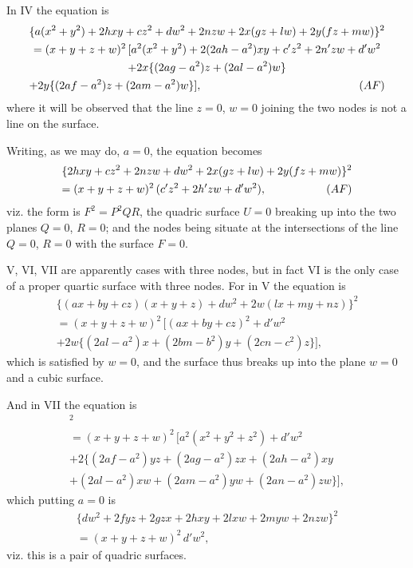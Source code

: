 \documentclass[11pt,a4paper]{article}
\begin{document}
\newpage
\setcounter{page}{310}

In IV the equation is
\begin{multline*}
\{a(x^{2}+y^{2}) + 2hxy + cz^{2} + dw^{2} + 2nzw + 2x(gz+lw) + 2y(fz+mw)\}^{2}\\
= (x+y+z+w)^{2}\, [a^{2}(x^{2}+y^{2}) + 2(2ah-a^{2})xy + c'z^{2} + 2n'zw + d'w^{2}\\
+ 2x\{(2ag-a^{2})z + (2al-a^{2})w\}\\
+ 2y\{(2af-a^{2})z + (2am-a^{2})w\}],\hfill(AF)
\end{multline*}
where it will be observed that the line $z=0$, $w=0$ joining the two nodes is not a line on the surface.

Writing, as we may do, $a=0$, the equation becomes
\begin{multline*}
\{2hxy + cz^{2} + 2nzw + dw^{2} + 2x(gz+lw) + 2y(fz+mw)\}^{2}\\
= (x+y+z+w)^{2}\, (c'z^{2} + 2h'zw + d'w^{2}),\hfill(AF)
\end{multline*}
viz. the form is $F^{2} = P^{2}QR$, the quadric surface $U=0$ breaking up into the two planes $Q=0$, $R=0$; and the nodes being situate at the intersections of the line $Q=0$, $R=0$ with the surface $F=0$.

V, VI, VII are apparently cases with three nodes, but in fact VI is the only case of a proper quartic surface with three nodes. For in V the equation is
\begin{multline*}
\{(ax+by+cz)(x+y+z) + dw^{2} + 2w(lx+my+nz)\}^{2}\\
= (x+y+z+w)^{2}\, [(ax+by+cz)^{2} + d'w^{2}\\
+ 2w\{(2al-a^{2})x + (2bm-b^{2})y + (2cn-c^{2})z\}],
\end{multline*}
which is satisfied by $w=0$, and the surface thus breaks up into the plane $w=0$ and a cubic surface.

And in VII the equation is
\begin{multline*}
[a(x^{2}+y^{2}+z^{2}) + dw^{2} + 2fyz + 2gzx + 2hxy + 2lxw + 2myw + 2nzw]^{2}\\
= (x+y+z+w)^{2}\, [a^{2}(x^{2}+y^{2}+z^{2}) + d'w^{2}\\
+ 2\{(2af-a^{2})yz + (2ag-a^{2})zx + (2ah-a^{2})xy\\
+ (2al-a^{2})xw + (2am-a^{2})yw + (2an-a^{2})zw\}],
\end{multline*}
which putting $a=0$ is
\begin{multline*}
\{dw^{2} + 2fyz + 2gzx + 2hxy + 2lxw + 2myw + 2nzw\}^{2}\\
= (x+y+z+w)^{2}\, d'w^{2},
\end{multline*}
viz. this is a pair of quadric surfaces.
\end{document}
